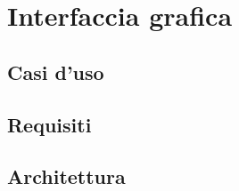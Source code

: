 \chapter{Interfaccia grafica}
\label{ch:appendice:interfaccia-grafica}
\section*{Casi d'uso}
\section*{Requisiti}
\section*{Architettura}
